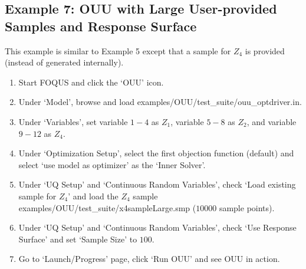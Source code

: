 \subsection{Example 7: OUU with Large User-provided Samples and Response Surface}

This example is similar to Example 5 except that a sample for $Z_4$ is provided
(instead of generated internally).

\begin{enumerate}
\item Start FOQUS and click the `OUU' icon.
\item Under `Model', browse and load {\sf examples/OUU/test\_suite/ouu\_optdriver.in}.
\item Under `Variables', set variable $1-4$ as $Z_1$, variable $5-8$ as $Z_2$, 
      and variable $9-12$ as $Z_4$.
\item Under `Optimization Setup', select the first objection function (default)
      and select `use model as optimizer' as the `Inner Solver'.
\item Under `UQ Setup' and `Continuous Random Variables', check `Load existing
      sample for $Z_4$' and load the $Z_4$ sample 
      {\sf examples/OUU/test\_suite/x4sampleLarge.smp} ($10000$ sample points).
\item Under `UQ Setup' and `Continuous Random Variables', check
      `Use Response Surface' and set `Sample Size' to $100$.
\item Go to `Launch/Progress' page, click `Run OUU' and see OUU in action.
\end{enumerate}
